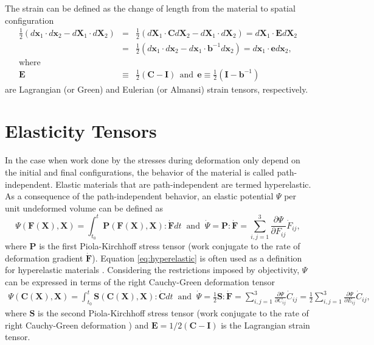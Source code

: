 \documentclass[12pt,aps,pre]{revtex4}
\begin{document}
The strain can be defined as the change of length from the material to spatial configuration
%
\begin{eqnarray}
\frac{1}{2}\left(d\pmb{x}_1 \cdot d\pmb{x}_2 - d\pmb{X}_1 \cdot d\pmb{X}_2 \right) &=& \frac{1}{2}\left(d\pmb{X}_1 \cdot \pmb{C} d\pmb{X}_2 - d\pmb{X}_1 \cdot d\pmb{X}_2 \right) = d\pmb{X}_1 \cdot \pmb{E} d\pmb{X}_2 \nonumber\\
%
&=& \frac{1}{2}\left(d\pmb{x}_1 \cdot d\pmb{x}_2 - d\pmb{x}_1 \cdot \pmb{b}^{-1} d\pmb{x}_2\right) = d\pmb{x}_1 \cdot \pmb{e} d\pmb{x}_2, \nonumber\\
%
\text{where}&&\nonumber\\
%
\pmb{E} &\equiv& \frac{1}{2} \left(\pmb{C} - \pmb{I} \right) \ \ \text{and} \ \ \pmb{e} \equiv \frac{1}{2}\left(\pmb{I} - \pmb{b}^{-1}\right)
\end{eqnarray}
%
are Lagrangian (or Green) and Eulerian (or Almansi) strain tensors, respectively.

\section{Elasticity Tensors}

In the case when work done by the stresses during deformation only depend on the initial and final configurations, the behavior of the material is called path-independent. Elastic materials that are path-independent are termed hyperelastic. As a consequence of the path-independent behavior, an elastic potential $\Psi$ per unit undeformed volume can be defined as
%
\begin{equation}
\Psi(\pmb{F}(\pmb{X}),\pmb{X}) = \int_{t_0}^t \pmb{P}(\pmb{F}(\pmb{X}),\pmb{X}):\dot{\pmb{F}}dt \ \text{ and } \ \dot{\Psi} = \pmb{P} : \dot{\pmb{F}} = \sum_{i,j=1}^3\frac{\partial \Psi}{\partial F_{ij}}\dot{F}_{ij},
\label{eq:hyperelastic}
\end{equation}
%  
where $\pmb{P}$ is the first Piola-Kirchhoff stress tensor (work conjugate to the rate of deformation gradient $\dot{\pmb{F}}$). Equation \eqref{eq:hyperelastic} is often used as a definition for hyperelastic materials \cite{JavierBonet:2008uxa}. Considering the restrictions imposed by objectivity, $\Psi$ can be expressed in terms of the right Cauchy-Green deformation tensor 
%
\begin{eqnarray}
\Psi(\pmb{C}(\pmb{X}),\pmb{X}) = \int_{t_0}^t \pmb{S}(\pmb{C}(\pmb{X}),\pmb{X}) : \dot{\pmb{C}} dt \ \text{ and } \ \dot{\Psi} =  \frac{1}{2}\pmb{S}:\dot{\pmb{F}} = \sum_{i,j=1}^3\frac{\partial \Psi}{\partial C_{ij}}\dot{C}_{ij} = \frac{1}{2} \sum_{i,j=1}^3\frac{\partial \Psi}{\partial E_{ij}}\dot{C}_{ij}, 
\end{eqnarray}
%
where $\pmb{S}$ is the second Piola-Kirchhoff stress tensor (work conjugate to the rate of right Cauchy-Green deformation ) and $\pmb{E} = 1/2(\pmb{C}-\pmb{I})$ is the Lagrangian strain tensor.
\end{document}
